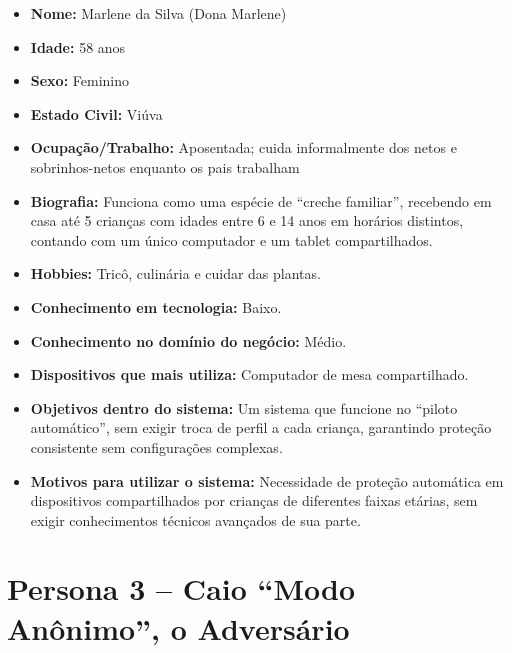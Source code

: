 \documentclass[
    12pt,           %
    oneside,        %
    a4paper,        %
    chapter=TITLE,  %
    english,        %
    brazil          %
]{abntex2}
\begin{document}
\begin{itemize}
    \item \textbf{Nome:} Marlene da Silva (Dona Marlene)
    \item \textbf{Idade:} 58 anos
    \item \textbf{Sexo:} Feminino
    \item \textbf{Estado Civil:} Viúva
    \item \textbf{Ocupação/Trabalho:} Aposentada; cuida informalmente dos netos e sobrinhos-netos enquanto os pais trabalham
    \item \textbf{Biografia:} Funciona como uma espécie de ``creche familiar'', recebendo em casa até 5 crianças com idades entre 6 e 14 anos em horários distintos, contando com um único computador e um tablet compartilhados.
    \item \textbf{Hobbies:} Tricô, culinária e cuidar das plantas.
    \item \textbf{Conhecimento em tecnologia:} Baixo.
    \item \textbf{Conhecimento no domínio do negócio:} Médio.
    \item \textbf{Dispositivos que mais utiliza:} Computador de mesa compartilhado.
    \item \textbf{Objetivos dentro do sistema:} Um sistema que funcione no ``piloto automático'', sem exigir troca de perfil a cada criança, garantindo proteção consistente sem configurações complexas.
    \item \textbf{Motivos para utilizar o sistema:} Necessidade de proteção automática em dispositivos compartilhados por crianças de diferentes faixas etárias, sem exigir conhecimentos técnicos avançados de sua parte.
\end{itemize}


\section{Persona 3 -- Caio ``Modo Anônimo'', o Adversário}
\end{document}
